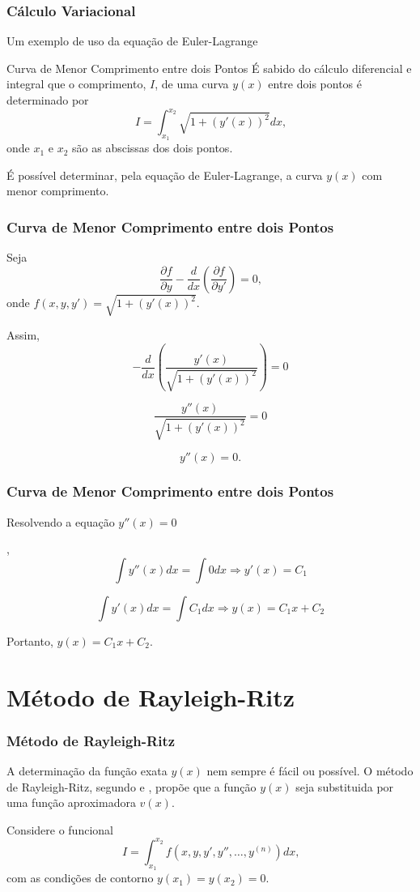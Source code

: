 \documentclass{beamer}
\newif\ifcompilepause
\newcommand{\cpause}{
	\ifcompilepause
	\pause
	\fi
}
\begin{document}
	\begin{frame}
		\frametitle{Cálculo Variacional}
		\justify
		
		Um exemplo de uso da equação de Euler-Lagrange
		\cpause
		\begin{block}{Curva de Menor Comprimento entre dois Pontos}
			É sabido do cálculo diferencial e integral que o comprimento, $I$, de uma curva $y(x)$ entre dois pontos é determinado por
			$$
				I=\int_{x_1}^{x_2} \sqrt{1+(y'(x))^2} dx
				\text{,}
			$$
			onde $x_1$ e $x_2$ são as abscissas dos dois pontos.
			
			É possível determinar, pela equação de Euler-Lagrange, a curva $y(x)$ com menor comprimento.
		\end{block}
	\end{frame}
	
	\begin{frame}
		\frametitle{Curva de Menor Comprimento entre dois Pontos}
		\justify
		
		Seja
		$$
			\frac{\partial f}{\partial y}
			-
			\frac{d}{dx} \left (
				\frac{\partial f}{\partial y'}
			\right )
			= 0
			\text{,}
		$$
		onde $f(x, y, y')=\sqrt{1+(y'(x))^2}$. \cpause Assim,
		$$
			-\frac{d}{dx} \left (
				\frac{y'(x)}{\sqrt{1+(y'(x))^2}}
			\right )
			= 0
		$$
		\cpause
		$$
			\frac{y''(x)}{
				\sqrt{1+(y'(x))^2}
			}
			= 0
		$$
		\cpause
		$$
			y''(x)=0
			\text{.}
		$$
	\end{frame}
	
	\begin{frame}
		\frametitle{Curva de Menor Comprimento entre dois Pontos}
		\justify
		
		Resolvendo a equação $y''(x)=0$\cpause ,
		$$
			\int y''(x)dx = \int 0 dx \Longrightarrow y'(x) = C_1
		$$
		\cpause
		$$
			\int y'(x)dx = \int C_1 dx \Longrightarrow y(x) = C_1 x + C_2
		$$
		\cpause
		Portanto, $y(x)=C_1 x + C_2$.
	\end{frame}
	
	
	\section{Método de Rayleigh-Ritz}
	\makesubtitleframe{Método de Rayleigh-Ritz}
	
	\begin{frame}
		\frametitle{Método de Rayleigh-Ritz}
		\justify
		
		A determinação da função exata $y(x)$ nem sempre é fácil ou possível. O método de Rayleigh-Ritz, segundo  e , propõe que a função $y(x)$ seja substituida por uma função aproximadora $v(x)$.
		\vspace{10pt}
		\cpause
		
		Considere o funcional
		$$
			I = \int_{x_1}^{x_2} f(x, y, y', y'', \dots, y^{(n)})dx\text{,}
		$$
		com as condições de contorno $y(x_1)=y(x_2)=0$.
	\end{frame}
	
\end{document}
